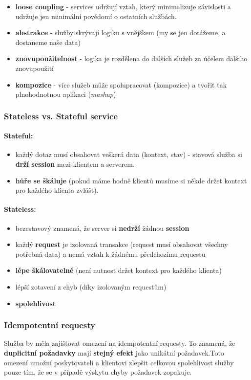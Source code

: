 \begin{itemize}[itemsep=0px]
\item \textbf{loose coupling} - services udržují vztah, který minimalizuje závislosti a udržuje jen minimální povědomí o ostatních službách.
\item \textbf{abstrakce} - služby skrývají logiku s vnějškem (my se jen dotážeme, a dostaneme naše data)
\item \textbf{znovupoužitelnost} - logika je rozdělena do dalších služeb za účelem dalšiho znovupoužití
\item \textbf{kompozice} - více služeb může spolupracovat (kompozice) a tvořit tak plnohodnotnou aplikaci (\textit{mashup})
\end{itemize}


\subsubsection*{Stateless vs. Stateful service}
\paragraph{Stateful:}
\begin{itemize}[itemsep=0px]
\item každý dotaz musí obsahovat veškerá data (kontext, stav) - stavová služba si \textbf{drží session} mezi klientem a serverem.
\item \textbf{hůře se škáluje} (pokud máme hodně klientů musíme si někde držet kontext pro každého klienta zvlášť).
\end{itemize}
\paragraph{Stateless:}
\begin{itemize}[itemsep=0px]
\item bezestavový znamená, že server si \textbf{nedrží} žádnou \textbf{session}
\item každý \textbf{request} je iz\textbf{}olovaná transakce (request musí obsahovat všechny potřebná data) a nemá vztah k žádnému předchozímu requestu
\item \textbf{lépe škálovatelné} (není nutnost držet kontext pro každého klienta)
\item lépší zotavení z chyb (díky izolovaným requestům)
\item \textbf{spolehlivost}
\end{itemize}

\subsubsection*{Idempotentní requesty}
Služba by měla zajišťovat omezení na idempotentní requesty. To znamená, že \textbf{duplicitní požadavky} mají \textbf{stejný efekt} jako unikátní požadavek.Toto omezení umožní poskytovateli a klientovi zlepšit celkovou spolehlivost služby
pouze tím, že se v případě výskytu chyby požadavek zopakuje.

